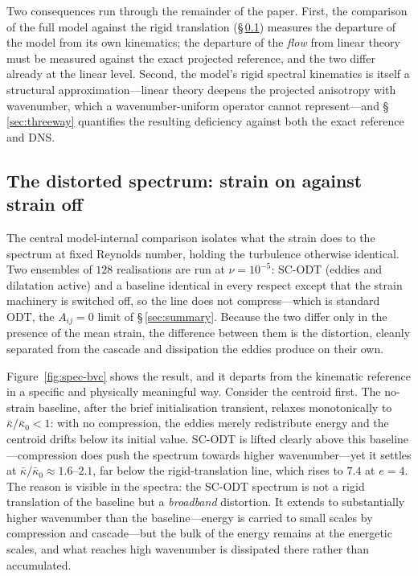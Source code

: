 \documentclass[lineno]{JFM-FLM_Au}
\begin{document}
Two consequences run through the remainder of the paper. First, the
comparison of the full model against the rigid translation
(\S\,\ref{sec:spec-bvc}) measures the departure of the model from its own
kinematics; the departure of the \emph{flow} from linear theory must be
measured against the exact projected reference, and the two differ already
at the linear level. Second, the model's rigid spectral kinematics is
itself a structural approximation---linear theory deepens the projected
anisotropy with wavenumber, which a wavenumber-uniform operator cannot
represent---and \S\,\ref{sec:threeway} quantifies the resulting deficiency
against both the exact reference and DNS.


\subsection{The distorted spectrum: strain on against strain
off}\label{sec:spec-bvc}

The central model-internal comparison isolates what the strain does to
the spectrum at fixed Reynolds number, holding the turbulence otherwise
identical. Two ensembles of $128$ realisations are run at $\nu=10^{-5}$:
SC-ODT (eddies and dilatation active) and a baseline identical
in every respect except that the strain machinery is switched off, so
the line does not compress---which is standard ODT, the $A_{ij}=0$
limit of \S\,\ref{sec:summary}. Because the two differ only in the presence
of the mean strain, the difference between them is the distortion,
cleanly separated from the cascade and dissipation the eddies produce on
their own.

Figure~\ref{fig:spec-bvc} shows the result, and it departs from the
kinematic reference in a specific and physically meaningful way.
Consider the centroid first. The no-strain baseline, after the brief
initialisation transient, relaxes monotonically to
$\bar\kappa/\bar\kappa_0<1$: with no compression, the eddies merely
redistribute energy and the centroid drifts below its initial value.
SC-ODT is lifted clearly above this baseline---compression does push
the spectrum towards higher wavenumber---yet it settles at
$\bar\kappa/\bar\kappa_0\approx1.6$--$2.1$, far below the
rigid-translation line, which rises to $7.4$ at $e=4$. The reason is
visible in the spectra: the SC-ODT spectrum is not a rigid
translation of the baseline but a \emph{broadband} distortion. It
extends to substantially higher wavenumber than the baseline---energy is carried to small scales by compression and cascade---but the
bulk of the energy remains at the energetic scales, and what reaches
high wavenumber is dissipated there rather than accumulated.
\end{document}
